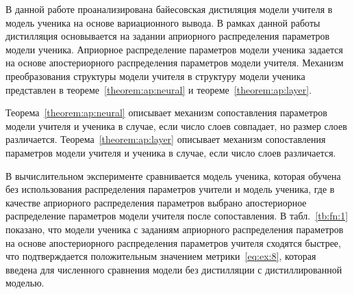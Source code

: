 \documentclass[12pt]{a&t}
\begin{document}
В данной работе проанализирована байесовская дистиляция модели учителя в модель ученика на основе вариационного вывода.
В рамках данной работы дистилляция основывается на задании априорного распределения параметров модели ученика.
Априорное распределение параметров модели ученика задается на основе апостериорного распределения параметров модели учителя.
Механизм преобразования структуры модели учителя в структуру модели ученика представлен в теореме~\ref{theorem:ap:neural} и теореме~\ref{theorem:ap:layer}.

Теорема~\ref{theorem:ap:neural} описывает механизм сопоставления параметров модели учителя и ученика в случае, если число слоев совпадает, но размер слоев различается. Теорема~\ref{theorem:ap:layer} описывает механизм сопоставления параметров модели учителя и ученика в случае, если число слоев различается.

В вычислительном эксперименте сравнивается модель ученика, которая обучена без использования распределения параметров учители и модель ученика, где в качестве априорного распределения параметров выбрано апостериорное распределение параметров модели учителя после сопоставления. В табл.~\ref{tb:fn:1} показано, что модели ученика с заданиям априорного распределения параметров на основе апостериорного распределения параметров учителя сходятся быстрее, что подтверждается положительным значением метрики~\eqref{eq:ex:8}, которая введена для численного сравнения модели без дистилляции с  дистиллированной моделью.
\end{document}
